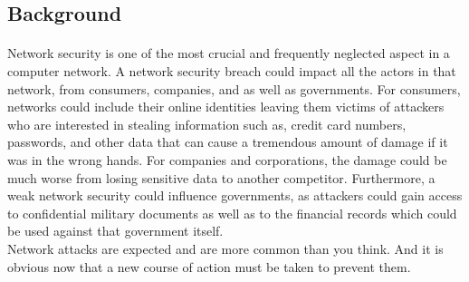 \documentclass[main.tex]{subfiles}
\begin{document}
\begin{center}\section{Background}\end{center}
\paragraph{}
Network security is one of the most crucial and frequently neglected aspect in a computer network. A network security breach could impact all the actors in that network, from consumers, companies, and as well as governments. For consumers, networks could include their online identities leaving them victims of attackers who are interested in stealing information such as, credit card numbers, passwords, and other data that can cause a tremendous amount of damage if it was in the wrong hands. For companies and corporations, the damage could be much worse from losing sensitive data to another competitor. Furthermore, a weak network security could influence governments, as attackers could gain access to confidential military documents as well as to the financial records which could be used against that government itself.\\
Network attacks are expected and are more common than you think. And it is obvious now that a new course of action must be taken to prevent them.
\end{document}
